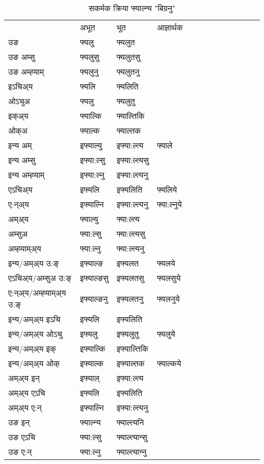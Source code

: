 \begin{table}[H]
\label{ɛl.vt} \centering
\caption{सकर्मक क्रिया  फ्याल्न्य  "बिग्रनु"  }
\begin{tabular}{l|l|l|l|l|l|l|l|l|l|l|l|l}  \toprule
&अभूत & भूत & आज्ञार्थक \\ 
उङ &फ्यलु &फ्यलुत \\ 
उङ अम्सु &फ्यलुसु &फ्यलुतसु \\ 
उङ अम्ह्‍याम् &फ्यलुनु &फ्यलुतनु \\ 
इऽचिअ्य &फ्यलि &फ्यलिति   \\ 
ओऽचुअ &फ्यलु &फ्यलुतु   \\ 
इक्अ्य &फ्याल्कि &फ्याल्तिकि   \\ 
ओक्अ &फ्याल्क &फ्याल्तक   \\ 
इन्य अम् & इफ्याल्यु  & इफ्या:ल्त्य &फ्याले  \\ 
इन्य अम्सु & इफ्या:ल्सु  & इफ्या:ल्त्यसु   \\ 
इन्य अम्ह्‍याम् & इफ्या:ल्नु  & इफ्या:ल्त्यनु   \\ 
एऽचिअ्य & इफ्यलि & इफ्यलिति &फ्यलिये    \\ 
ए:न्अ्य & इफ्याल्नि  & इफ्या:ल्त्यनु &फ्या:ल्नुये  \\ 
अम्अ्य & फ्याल्यु  & फ्या:ल्त्य  \\ 
अम्सुअ & फ्या:ल्सु & फ्या:ल्त्यसु  \\ 
अम्ह्‍याम्अ्य & फ्या:ल्नु  & फ्या:ल्त्यनु \\ 
\midrule
इन्य/अम्अ्य उ:ङ्‌&इफ्याल्ङ & इफ्यलत &फ्यलये \\ 
एऽचिअ्य/अम्सुअ उ:ङ्‌ &इफ्याल्ङसु & इफ्यलतसु &फ्यलसुये \\ 
ए:न्अ्य/अम्ह्‍याम्अ्य उ:ङ्‌ &इफ्याल्ङनु & इफ्यलतनु &फ्यलनुये \\ 
इन्य/अम्अ्य इऽचि & इफ्यलि & इफ्यलिति    \\ 
इन्य/अम्अ्य ओऽचु & इफ्यलु & इफ्यलुतु  &फ्यलुये  \\ 
इन्य/अम्अ्य इक् & इफ्याल्कि & इफ्याल्तिकि   \\ 
इन्य/अम्अ्य ओक् & इफ्याल्क & इफ्याल्तक  &फ्याल्कये  \\ 
अम्अ्य इन् & इफ्याल् & इफ्या:ल्त्य   \\ 
अम्अ्य एऽचि & इफ्यलि & इफ्यलिति    \\ 
अम्अ्य ए:न् & इफ्याल्नि  & इफ्या:ल्त्यनु  \\ 
\midrule
उङ इन् & फ्याल्न्य  & फ्याल्त्यनि  \\ 
उङ एऽचि & फ्या:ल्सु  & फ्याल्त्यान्सु   \\ 
उङ ए:न्& फ्या:ल्नु  & फ्याल्त्यान्‍नु   \\ 
\bottomrule
\end{tabular}
\end{table}


